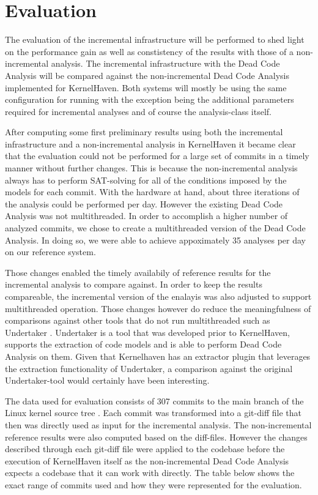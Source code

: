 \documentclass[a4paper]{article}
\begin{document}
\newpage
\section{Evaluation}

The evaluation of the incremental infrastructure will be performed to shed light on the performance gain as well as constistency of the results with those of a non-incremental analysis. The incremental infrastructure with the Dead Code Analysis will be compared against the non-incremental Dead Code Analysis implemented for KernelHaven. Both systems will mostly be using the same configuration for running with the exception being the additional parameters required for incremental analyses and of course the analysis-class itself.

After computing some first preliminary results using both the incremental infrastructure and a non-incremental analysis in KernelHaven it became clear that the evaluation could not be performed for a large set of commits in a timely manner without further changes. This is because the non-incremental analysis always has to perform SAT-solving for all of the conditions imposed by the models for each commit. With the hardware at hand, about three iterations of the analysis could be performed per day. However the existing Dead Code Analysis was not multithreaded. In order to accomplish a higher number of analyzed commits, we chose to create a multithreaded version of the Dead Code Analysis. In doing so, we were able to achieve appoximately 35 analyses per day on our reference system.

Those changes enabled the timely availabily of reference results for the incremental analysis to compare against. In order to keep the results compareable, the incremental version of the enalayis was also adjusted to support multithreaded operation. Those changes however do reduce the meaningfulness of comparisons against other tools that do not run multithreaded such as Undertaker \cite{Tartler:2011:FCC:1966445.1966451}. Undertaker is a tool that was developed prior to KernelHaven, supports the extraction of code models and is able to perform Dead Code Analysis on them. Given that Kernelhaven has an extractor plugin that leverages the extraction functionality of Undertaker, a comparison against the original Undertaker-tool would certainly have been interesting.

The data used for evaluation consists of 307 commits to the main branch of the Linux kernel source tree \cite{linux}. Each commit was transformed into a git-diff file that then was directly used as input for the incremental analysis. The non-incremental reference results were also computed based on the diff-files. However the changes described through each git-diff file were applied to the codebase before the execution of KernelHaven itself as the non-incremental Dead Code Analysis expects a codebase that it can work with directly. The table below shows the exact range of commits used and how they were represented for the evaluation.
\end{document}
